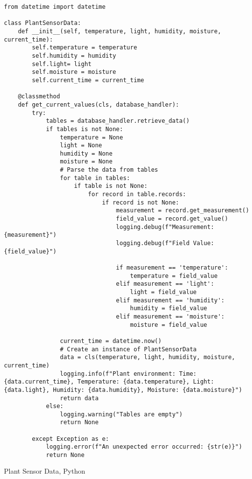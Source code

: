 \begin{longlisting}
\begin{verbatim}
from datetime import datetime

class PlantSensorData:
    def __init__(self, temperature, light, humidity, moisture, current_time):
        self.temperature = temperature
        self.humidity = humidity
        self.light= light
        self.moisture = moisture
        self.current_time = current_time

    @classmethod
    def get_current_values(cls, database_handler):
        try:
            tables = database_handler.retrieve_data()
            if tables is not None:
                temperature = None
                light = None
                humidity = None
                moisture = None
                # Parse the data from tables
                for table in tables:
                    if table is not None:
                        for record in table.records:
                            if record is not None:
                                measurement = record.get_measurement()
                                field_value = record.get_value()
                                logging.debug(f"Measurement: {measurement}")
                                logging.debug(f"Field Value: {field_value}")

                                if measurement == 'temperature':
                                    temperature = field_value
                                elif measurement == 'light':
                                    light = field_value
                                elif measurement == 'humidity':
                                    humidity = field_value
                                elif measurement == 'moisture':
                                    moisture = field_value

                current_time = datetime.now()
                # Create an instance of PlantSensorData
                data = cls(temperature, light, humidity, moisture, current_time)
                logging.info(f"Plant environment: Time: {data.current_time}, Temperature: {data.temperature}, Light: {data.light}, Humidity: {data.humidity}, Moisture: {data.moisture}")
                return data
            else:
                logging.warning("Tables are empty")
                return None

        except Exception as e:
            logging.error(f"An unexpected error occurred: {str(e)}")
            return None
\end{verbatim}
\caption{Plant Sensor Data, Python}\label{cde:applicationService}
\end{longlisting}
\newpage

